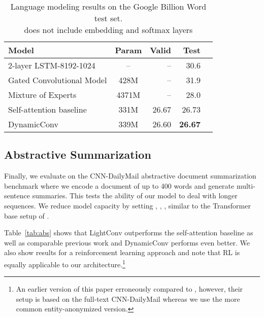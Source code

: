 \documentclass{article} \usepackage{iclr2019_conference,times}
\def\sdconv{LightConv}
\def\tvsdconv{DynamicConv}
\def\cnndm{CNN-DailyMail}
\begin{document}
\begin{table*}
\centering
\begin{tabular}{lcrrr}
\toprule
Model & Param & Valid & Test \\
\midrule
2-layer LSTM-8192-1024 \citep{jozefowicz2016lm} & -- & -- & 30.6 \\
Gated Convolutional Model \citep{dauphin2017convlm} & 428M & -- & 31.9  \\
Mixture of Experts \citep{shazeer2017outrageously} & 4371M  & -- & 28.0 \\
\midrule
Self-attention baseline & 331M & 26.67 & 26.73 \\  
\tvsdconv{} & 339M & 26.60 & \textbf{26.67} \\ 
\bottomrule
\end{tabular}
\caption{Language modeling results on the Google Billion Word test set. \\
\small{does not include embedding and softmax layers}}
\label{tab:gbw_lm}
\end{table*}


\subsection{Abstractive Summarization}\label{sec:abs}

Finally, we evaluate on the \cnndm{} abstractive document summarization benchmark where we encode a document of up to 400 words and generate multi-sentence summaries. 
This tests the ability of our model to deal with longer sequences.
We reduce model capacity by setting , , , similar to the Transformer base setup of \citet{vaswani2017transformer}.

Table~\ref{tab:abs} shows that \sdconv{} outperforms the self-attention baseline as well as comparable previous work and \tvsdconv{} performs even better.
We also show results for a reinforcement learning approach \citep{celikyilmaz2018deep} and note that RL is equally applicable to our architecture.\footnote{An earlier version of this paper erroneously compared to \citet{gehrmann2018bottom}, however, their setup is based on the full-text \cnndm{} whereas we use the more common entity-anonymized version.}
\end{document}
